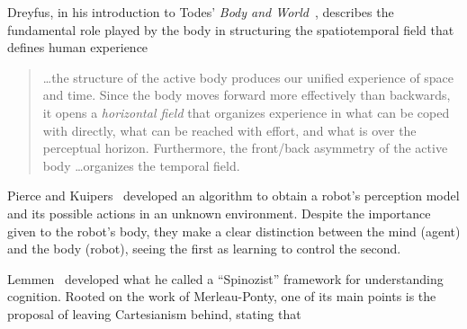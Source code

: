 \documentclass{article}
\begin{document}

Dreyfus, in his introduction to Todes' \emph{Body and World}~\cite{todes2001},
describes the fundamental role played by the body in structuring the
spatiotemporal field that defines human experience

\begin{quotation}
  \dots the structure of the active body produces our unified experience of
  space and time. Since the body moves forward more effectively than backwards,
  it opens a \emph{horizontal field} that organizes experience in what can be
  coped with directly, what can be reached with effort, and what is over the
  perceptual horizon. Furthermore, the front/back asymmetry of the active body
  \dots organizes the temporal field.
\end{quotation}


Pierce and Kuipers~\cite{pierce1997} developed an algorithm to obtain a robot's
perception model and its possible actions in an unknown environment. Despite the
importance given to the robot's body, they make a clear distinction between the
mind (agent) and the body (robot), seeing the first as learning to control the
second.


Lemmen~\cite{lemmen1997} developed what he called a ``Spinozist'' framework for
understanding cognition. Rooted on the work of Merleau-Ponty, one of its main
points is the proposal of leaving Cartesianism behind, stating that
\end{document}
